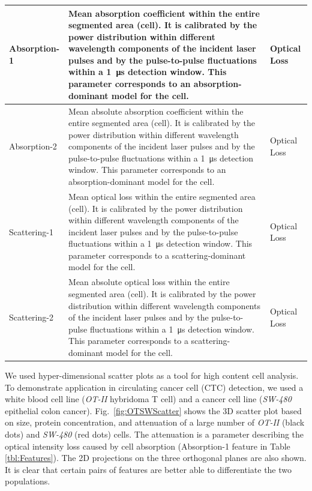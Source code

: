 \documentclass[aps,pra,reprint,superscriptaddress]{revtex4-1}
\begin{document}
\begin{table}
\begin{tabular}{|p{}|p{}|p{}|}
Absorption-1	 &Mean absorption coefficient within the entire segmented area (cell). It is calibrated by the power distribution within different wavelength components of the incident laser pulses and by the pulse-to-pulse fluctuations within a \SI{1}{\micro\second} detection window. This parameter corresponds to an absorption-dominant model for the cell.	 &Optical Loss\\ \hline
Absorption-2	 &Mean absolute absorption coefficient within the entire segmented area (cell). It is calibrated by the power distribution within different wavelength components of the incident laser pulses and by the pulse-to-pulse fluctuations within a \SI{1}{\micro\second} detection window. This parameter corresponds to an absorption-dominant model for the cell.	 &Optical Loss\\ \hline
Scattering-1	 &Mean optical loss within the entire segmented area (cell). It is calibrated by the power distribution within different wavelength components of the incident laser pulses and by the pulse-to-pulse fluctuations within a \SI{1}{\micro\second} detection window. This parameter corresponds to a scattering-dominant model for the cell.	 &Optical Loss\\ \hline
Scattering-2	 &Mean absolute optical loss within the entire segmented area (cell). It is calibrated by the power distribution within different wavelength components of the incident laser pulses and by the pulse-to-pulse fluctuations within a \SI{1}{\micro\second} detection window. This parameter corresponds to a scattering-dominant model for the cell.	 &Optical Loss\\
\hline
\end{tabular}
\end{table}

We used hyper-dimensional scatter plots as a tool for high content cell analysis. To demonstrate application in circulating cancer cell (CTC) detection, we used a white blood cell line (\textit{OT-II} hybridoma T cell) and a cancer cell line (\textit{SW-480} epithelial colon cancer). Fig.~\ref{fig:OTSWScatter} shows the 3D scatter plot based on size, protein concentration, and attenuation of a large number of \textit{OT-II} (black dots) and \textit{SW-480} (red dots) cells. The attenuation is a parameter describing the optical intensity loss caused by cell absorption (Absorption-1 feature in Table \ref{tbl:Features}). The 2D projections on the three orthogonal planes are also shown. It is clear that certain pairs of features are better able to differentiate the two populations.
\end{document}

